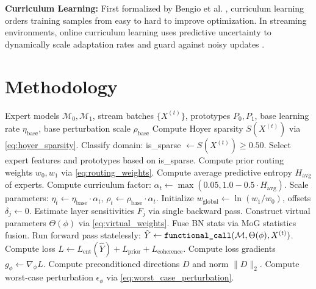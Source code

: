\documentclass{article}
\theoremstyle{plain}
\theoremstyle{definition}
\theoremstyle{remark}
\begin{document}
\textbf{Curriculum Learning:} First formalized by Bengio et al. \cite{bengio2009curriculum}, curriculum learning orders training samples from easy to hard to improve optimization. In streaming environments, online curriculum learning uses predictive uncertainty to dynamically scale adaptation rates and guard against noisy updates \cite{platanios2018competence, kumar2010self}.

\section{Methodology}
\label{sec:method}

\begin{algorithm}[!ht]
\caption{Curriculum-Gated Sharpness-Aware TTMM}
\label{alg:cg_sam}
\footnotesize
\begin{algorithmic}[1]
\REQUIRE Expert models $\mathcal{M}_0, \mathcal{M}_1$, stream batches $\{X^{(t)}\}$, prototypes $P_0, P_1$, base learning rate $\eta_{\text{base}}$, base perturbation scale $\rho_{\text{base}}$
    \STATE Compute Hoyer sparsity $S(X^{(t)})$ via \cref{eq:hoyer_sparsity}.
    \STATE Classify domain: is\_sparse $\leftarrow S(X^{(t)}) \geq 0.50$.
    \STATE Select expert features and prototypes based on is\_sparse.
    \STATE Compute prior routing weights $w_0, w_1$ via \cref{eq:routing_weights}.
    \STATE Compute average predictive entropy $H_{\text{avg}}$ of experts.
    \STATE Compute curriculum factor: $\alpha_t \leftarrow \max(0.05, 1.0 - 0.5 \cdot H_{\text{avg}})$.
    \STATE Scale parameters: $\eta_t \leftarrow \eta_{\text{base}} \cdot \alpha_t$, $\rho_t \leftarrow \rho_{\text{base}} \cdot \alpha_t$.
    \STATE Initialize $w_{\text{global}} \leftarrow \ln(w_1 / w_0)$, offsets $\delta_j \leftarrow 0$.
    \STATE Estimate layer sensitivities $F_j$ via single backward pass.
        \STATE Construct virtual parameters $\Theta(\phi)$ via \cref{eq:virtual_weights}.
        \STATE Fuse BN stats via MoG statistics fusion.
        \STATE Run forward pass statelessly: $\hat{Y} \leftarrow \text{\texttt{functional\_call}}(\mathcal{M}, \Theta(\phi), X^{(t)})$.
        \STATE Compute loss $L \leftarrow L_{\text{ent}}(\hat{Y}) + L_{\text{prior}} + L_{\text{coherence}}$.
        \STATE Compute loss gradients $g_{\phi} \leftarrow \nabla_{\phi} L$.
            \STATE Compute preconditioned directions $D$ and norm $\|D\|_2$.
            \STATE Compute worst-case perturbation $\epsilon_{\phi}$ via \cref{eq:worst_case_perturbation}.

\end{algorithmic}
\end{algorithm}
\end{document}

